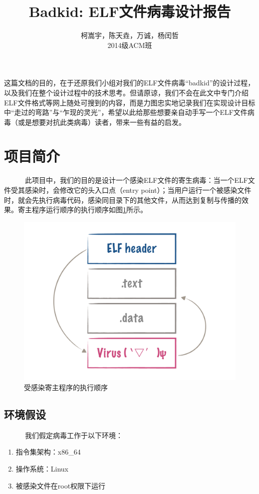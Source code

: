 \documentclass[a4paper, 11pt]{article}
\begin{document}
\title{Badkid: ELF文件病毒设计报告}

\author{柯嵩宇，陈天垚，万诚，杨闰哲\vspace{1em} \\ 2014级ACM班}
\maketitle

这篇文档的目的，在于还原我们小组对我们的ELF文件病毒“badkid”的设计过程，以及我们在整个设计过程中的技术思考。但请原谅，我们不会在此文中专门介绍ELF文件格式等网上随处可搜到的内容，而是力图忠实地记录我们在实现设计目标中“走过的弯路”与“乍现的灵光”，希望以此给那些想要亲自动手写一个ELF文件病毒（或是想要对抗此类病毒）读者，带来一些有益的启发。

\tableofcontents
\newpage
\section{项目简介}
	~~~~~~此项目中，我们的目的是设计一个感染ELF文件的寄生病毒：当一个ELF文件受其感染时，会修改它的头入口点（entry point）；当用户运行一个被感染文件时，就会先执行病毒代码，感染同目录下的其他文件，从而达到复制与传播的效果。寄主程序运行顺序的执行顺序如图\ref{fig:order}所示。
	\vspace{1em}
	\begin{figure}[htbp]
		\centering
		\includegraphics[width = \textwidth]{figures/fig1_order}
		\caption{受感染寄主程序的执行顺序}
		\label{fig:order}
	\end{figure}
\subsection{环境假设}	
	~~~~~~我们假定病毒工作于以下环境：
	\begin{enumerate}
		\item 指令集架构：x86\_64
		\item 操作系统：Linux
		\item 被感染文件在root权限下运行
	\end{enumerate}
	
\end{document}
